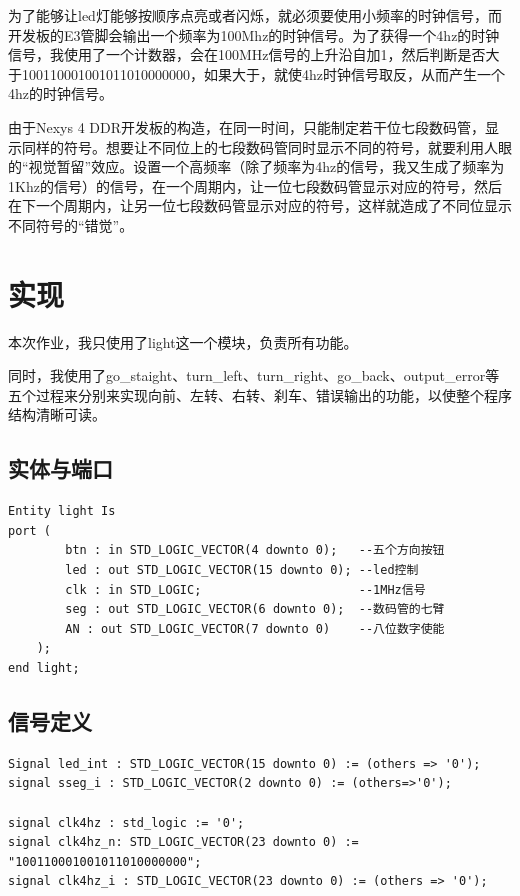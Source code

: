 \documentclass[11pt, a4paper]{article}
\begin{document}
\begin{CJK*}{UTF8}{gbsn}
  为了能够让led灯能够按顺序点亮或者闪烁，就必须要使用小频率的时钟信号，而开发板的E3管脚会输出一个频率为100Mhz的时钟信号。为了获得一个4hz的时钟信号，我使用了一个计数器，会在100MHz信号的上升沿自加1，然后判断是否大于100110001001011010000000，如果大于，就使4hz时钟信号取反，从而产生一个4hz的时钟信号。

  由于Nexys 4 DDR开发板的构造，在同一时间，只能制定若干位七段数码管，显示同样的符号。想要让不同位上的七段数码管同时显示不同的符号，就要利用人眼的“视觉暂留”效应。设置一个高频率（除了频率为4hz的信号，我又生成了频率为1Khz的信号）的信号，在一个周期内，让一位七段数码管显示对应的符号，然后在下一个周期内，让另一位七段数码管显示对应的符号，这样就造成了不同位显示不同符号的“错觉”。

  \section{实现}

  本次作业，我只使用了light这一个模块，负责所有功能。

  同时，我使用了go\_staight、turn\_left、turn\_right、go\_back、output\_error等五个过程来分别来实现向前、左转、右转、刹车、错误输出的功能，以使整个程序结构清晰可读。

  \subsection{实体与端口}
  
  \begin{verbatim}
Entity light Is
port (
		btn : in STD_LOGIC_VECTOR(4 downto 0);   --五个方向按钮
		led : out STD_LOGIC_VECTOR(15 downto 0); --led控制
		clk : in STD_LOGIC;                      --1MHz信号
		seg : out STD_LOGIC_VECTOR(6 downto 0);  --数码管的七臂
		AN : out STD_LOGIC_VECTOR(7 downto 0)    --八位数字使能
	);
end light;
  \end{verbatim}

  \subsection{信号定义}

  \begin{verbatim}
Signal led_int : STD_LOGIC_VECTOR(15 downto 0) := (others => '0');
signal sseg_i : STD_LOGIC_VECTOR(2 downto 0) := (others=>'0');

signal clk4hz : std_logic := '0';
signal clk4hz_n: STD_LOGIC_VECTOR(23 downto 0) := "100110001001011010000000";
signal clk4hz_i : STD_LOGIC_VECTOR(23 downto 0) := (others => '0');


\end{verbatim}
\end{CJK*}
\end{document}
